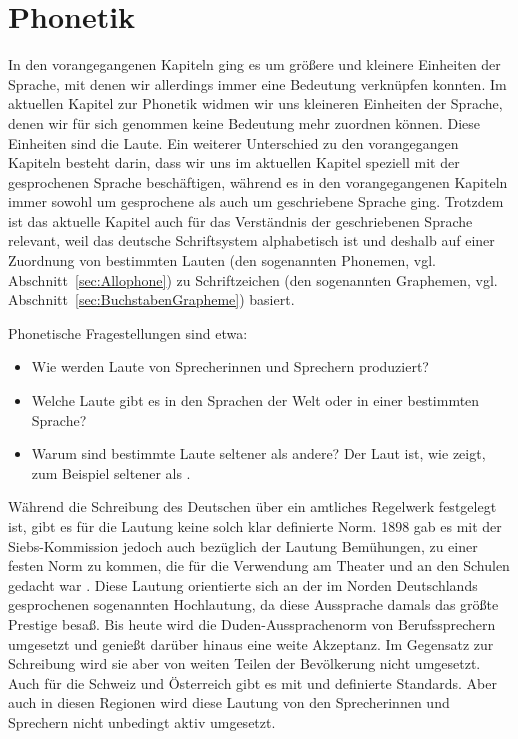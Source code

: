 \chapter{Phonetik}
\label{kap:Phonetik}

In den vorangegangenen Kapiteln ging es um größere und kleinere Einheiten der Sprache, mit denen wir allerdings immer eine Bedeutung verknüpfen konnten. Im aktuellen Kapitel zur Phonetik widmen wir uns kleineren Einheiten der Sprache, denen wir für sich genommen keine Bedeutung mehr zuordnen können. Diese Einheiten sind die Laute. Ein weiterer Unterschied zu den vorangegangen Kapiteln besteht darin, dass wir uns im aktuellen Kapitel speziell mit der gesprochenen Sprache beschäftigen, während es in den vorangegangenen Kapiteln immer sowohl um gesprochene als auch um geschriebene Sprache ging. Trotzdem ist das aktuelle Kapitel auch für das Verständnis der geschriebenen Sprache relevant, weil das deutsche Schriftsystem alphabetisch ist und deshalb auf einer Zuordnung von bestimmten Lauten (den sogenannten Phonemen, vgl. Abschnitt~\ref{sec:Allophone}) zu Schriftzeichen (den sogenannten Graphemen, vgl. Abschnitt~\ref{sec:BuchstabenGrapheme}) basiert. 

Phonetische Fragestellungen sind etwa:
\begin{itemize}
    \item Wie werden Laute von Sprecherinnen und Sprechern produziert?
    \item Welche Laute gibt es in den Sprachen der Welt oder in einer bestimmten Sprache?
    \item Warum sind bestimmte Laute seltener als andere? Der Laut \textipa{[g]} ist, wie \citet[719--721]{Maddieson2003} zeigt, zum Beispiel seltener als \textipa{[k]} .
\end{itemize}

Während die Schreibung des Deutschen über ein amtliches Regelwerk festgelegt ist, gibt es für die Lautung keine solch klar definierte Norm. 1898 gab es mit der Siebs-Kommission jedoch auch bezüglich der Lautung Bemühungen, zu einer festen Norm zu kommen, die für die Verwendung am Theater und an den Schulen gedacht war \citep[31f]{DudenAussprache2023}. Diese Lautung orientierte sich an der im Norden Deutschlands gesprochenen sogenannten Hochlautung, da diese Aussprache damals das größte Prestige besaß. Bis heute wird die Duden-Aussprachenorm von Berufssprechern umgesetzt und genießt darüber hinaus eine weite Akzeptanz. Im Gegensatz zur Schreibung wird sie aber von weiten Teilen der Bevölkerung nicht umgesetzt. Auch für die Schweiz und Österreich gibt es mit \citet{HoveHaas2009} und \citet{Wiesinger2009} definierte Standards. Aber auch in diesen Regionen wird diese Lautung von den Sprecherinnen und Sprechern nicht unbedingt aktiv umgesetzt. 

